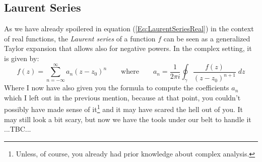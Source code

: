 



\subsection{Laurent Series}
As we have already spoilered in equation (\ref{Eq:LaurentSeriesReal}) in the context of real functions, the \emph{Laurent series} of a function $f$ can be seen as a generalized Taylor expansion that allows also for negative powers. In the complex setting, it is given by:
\begin{equation}
\label{Eq:LaurentSeries}
f(z) = \sum_{n=-\infty}^{\infty} a_n (z - z_0)^n 
\qquad \text{where} \qquad
a_n = \frac{1}{2 \pi i} \oint_{\gamma} \frac{f(z)}{(z-z_0)^{n+1}} \; dz
\end{equation}
Where I now have also given you the formula to compute the coefficients $a_n$ which I left out in the previous mention, because at that point, you couldn't possibly have made sense of it\footnote{Unless, of course, you already had prior knowledge about complex analysis.} and it may have scared the hell out of you. It may still look a bit scary, but now we have the tools under our belt to handle it ...TBC...



